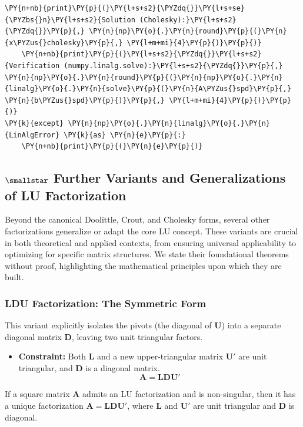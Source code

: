 \begin{Verbatim}[commandchars=\\\{\}]
    \PY{n+nb}{print}\PY{p}{(}\PY{l+s+s2}{\PYZdq{}}\PY{l+s+se}{\PYZbs{}n}\PY{l+s+s2}{Solution (Cholesky):}\PY{l+s+s2}{\PYZdq{}}\PY{p}{,} \PY{n}{np}\PY{o}{.}\PY{n}{round}\PY{p}{(}\PY{n}{x\PYZus{}cholesky}\PY{p}{,} \PY{l+m+mi}{4}\PY{p}{)}\PY{p}{)}
    \PY{n+nb}{print}\PY{p}{(}\PY{l+s+s2}{\PYZdq{}}\PY{l+s+s2}{Verification (numpy.linalg.solve):}\PY{l+s+s2}{\PYZdq{}}\PY{p}{,} \PY{n}{np}\PY{o}{.}\PY{n}{round}\PY{p}{(}\PY{n}{np}\PY{o}{.}\PY{n}{linalg}\PY{o}{.}\PY{n}{solve}\PY{p}{(}\PY{n}{A\PYZus{}spd}\PY{p}{,} \PY{n}{b\PYZus{}spd}\PY{p}{)}\PY{p}{,} \PY{l+m+mi}{4}\PY{p}{)}\PY{p}{)}
\PY{k}{except} \PY{n}{np}\PY{o}{.}\PY{n}{linalg}\PY{o}{.}\PY{n}{LinAlgError} \PY{k}{as} \PY{n}{e}\PY{p}{:}
    \PY{n+nb}{print}\PY{p}{(}\PY{n}{e}\PY{p}{)}
\end{Verbatim}

\subsection{\texorpdfstring{$\smallstar$}{*} Further Variants and Generalizations of LU Factorization}

Beyond the canonical Doolittle, Crout, and Cholesky forms, several other factorizations generalize or adapt the core LU concept. These variants are crucial in both theoretical and applied contexts, from ensuring universal applicability to optimizing for specific matrix structures. We state their foundational theorems without proof, highlighting the mathematical principles upon which they are built.

\subsubsection{LDU Factorization: The Symmetric Form}
This variant explicitly isolates the pivots (the diagonal of $\mathbf{U}$) into a separate diagonal matrix $\mathbf{D}$, leaving two unit triangular factors.

\begin{itemize}
    \item \textbf{Constraint:} Both $\mathbf{L}$ and a new upper-triangular matrix $\mathbf{U}'$ are unit triangular, and $\mathbf{D}$ is a diagonal matrix.
    \[ \mathbf{A} = \mathbf{L}\mathbf{D}\mathbf{U}' \]
\end{itemize}

\begin{theorem}
If a square matrix $\mathbf{A}$ admits an LU factorization and is non-singular, then it has a unique factorization $\mathbf{A} = \mathbf{L}\mathbf{D}\mathbf{U}'$, where $\mathbf{L}$ and $\mathbf{U}'$ are unit triangular and $\mathbf{D}$ is diagonal.
\end{theorem}

